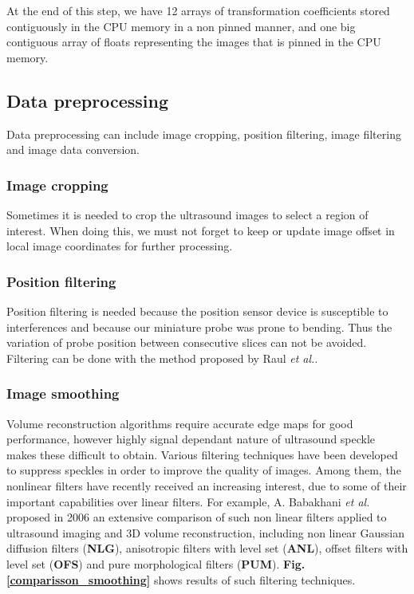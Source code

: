 \documentclass[12pt,journal,compsoc]{IEEEtran}
\begin{document}
At the end of this step, we have 12 arrays of transformation coefficients stored contiguously in the CPU memory in a non pinned manner, and one big contiguous array of floats representing the images that is pinned in the CPU memory. 

\subsection{Data preprocessing}

Data preprocessing can include image cropping, position filtering, image filtering and image data conversion.\par

\subsubsection{Image cropping}
Sometimes it is needed to crop the ultrasound images to select a region of interest. When doing this, we must not forget to keep or update image offset in local image coordinates for further processing. 

\subsubsection{Position filtering}
Position filtering is needed because the position sensor device is susceptible to interferences and because our miniature probe was prone to bending. Thus the variation of probe position between consecutive slices can not be avoided. Filtering can be done with the method proposed by Raul \textit{et al.}\textbf{\cite{9}}.\par

\subsubsection{Image smoothing}
Volume reconstruction algorithms require accurate edge maps for good performance, however highly signal dependant nature of ultrasound speckle makes these difficult to obtain. Various filtering techniques have been developed to suppress speckles in order to improve the quality of images. 
Among them, the nonlinear filters have recently received an increasing interest, due to some of their important capabilities over linear filters. For example, A. Babakhani \textit{et al.}\textbf{\cite{1}} proposed in 2006 an extensive comparison of such non linear filters applied to ultrasound imaging and 3D volume reconstruction, including non linear Gaussian diffusion filters (\textbf{NLG}), anisotropic filters with level set (\textbf{ANL}), offset filters with level set (\textbf{OFS}) and pure morphological filters (\textbf{PUM}). \textbf{Fig.\ref{comparisson_smoothing}} shows results of such filtering techniques.\par
\end{document}

